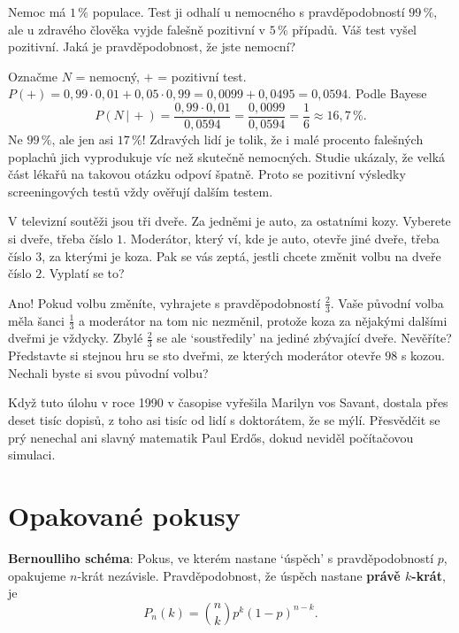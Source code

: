 \begin{example}\label{ex:lekarsky-test}
  Nemoc má $1\,\%$ populace. Test ji odhalí u nemocného s pravděpodobností $99\,\%$, ale u zdravého člověka vyjde falešně pozitivní v $5\,\%$ případů. Váš test vyšel pozitivní. Jaká je pravděpodobnost, že jste nemocní?

  Označme $N$ = nemocný, $+$ = pozitivní test. $P(+) = 0{,}99\cdot 0{,}01 + 0{,}05\cdot 0{,}99 = 0{,}0099 + 0{,}0495 = 0{,}0594$. Podle Bayese
  \begin{equation*}
    P(N\,|\,+) = \frac{0{,}99\cdot 0{,}01}{0{,}0594} = \frac{0{,}0099}{0{,}0594} = \frac{1}{6}\approx 16{,}7\,\%.
  \end{equation*}
  Ne $99\,\%$, ale jen asi $17\,\%$! Zdravých lidí je tolik, že i malé procento falešných poplachů jich vyprodukuje víc než skutečně nemocných. Studie ukázaly, že velká část lékařů na takovou otázku odpoví špatně. Proto se pozitivní výsledky screeningových testů vždy ověřují dalším testem.
\end{example}

\begin{example}\label{ex:monty-hall}
  V televizní soutěži jsou tři dveře. Za jedněmi je auto, za ostatními kozy. Vyberete si dveře, třeba číslo $1$. Moderátor, který ví, kde je auto, otevře jiné dveře, třeba číslo $3$, za kterými je koza. Pak se vás zeptá, jestli chcete změnit volbu na dveře číslo $2$. Vyplatí se to?

  Ano! Pokud volbu změníte, vyhrajete s pravděpodobností $\frac{2}{3}$. Vaše původní volba měla šanci $\frac{1}{3}$ a moderátor na tom nic nezměnil, protože koza za nějakými dalšími dveřmi je vždycky. Zbylé $\frac{2}{3}$ se ale `soustředily' na jediné zbývající dveře. Nevěříte? Představte si stejnou hru se sto dveřmi, ze kterých moderátor otevře $98$ s kozou. Nechali byste si svou původní volbu?

  Když tuto úlohu v roce 1990 v časopise vyřešila Marilyn vos Savant, dostala přes deset tisíc dopisů, z toho asi tisíc od lidí s doktorátem, že se mýlí. Přesvědčit se prý nenechal ani slavný matematik Paul Erdős, dokud neviděl počítačovou simulaci.
\end{example}

\section{Opakované pokusy}\label{sec:opakovane-pokusy}

\begin{definitionbox}
  \textbf{Bernoulliho schéma}: Pokus, ve kterém nastane `úspěch' s pravděpodobností $p$, opakujeme $n$-krát nezávisle. Pravděpodobnost, že úspěch nastane \textbf{právě $k$-krát}, je
  \begin{equation*}
    P_n(k) = \binom{n}{k}p^k{(1 - p)}^{n - k}.
  \end{equation*}
\end{definitionbox}

